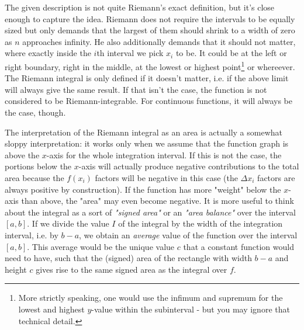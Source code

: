 \medskip
The given description is not quite Riemann's exact definition, but it's close enough to capture the idea. Riemann does not require the intervals to be equally sized but only demands that the largest of them should shrink to a width of zero as $n$ approaches infinity. He also additionally demands that it should not matter, where exactly inside the $i$th interval we pick $x_i$ to be. It could be at the left or right boundary, right in the middle, at the lowest or highest point\footnote{More strictly speaking, one would use the infimum and supremum for the lowest and highest $y$-value within the subinterval - but you may ignore that technical detail.} or whereever. The Riemann integral is only defined if it doesn't matter, i.e. if the above limit will always give the same result. If that isn't the case, the function is not considered to be Riemann-integrable. For continuous functions, it will always be the case, though.




\medskip
The interpretation of the Riemann integral as an area is actually a somewhat sloppy interpretation: it works only when we assume that the function graph is above the $x$-axis for the whole integration interval. If this is not the case, the portions below the $x$-axis will actually produce negative contributions to the total area because the $f(x_i)$ factors will be negative in this case (the $\Delta x_i$ factors are always positive by construction). If the function has more "weight" below the $x$-axis than above, the "area" may even become negative. It is more useful to think about the integral as a sort of \emph{"signed area"} or an \emph{"area balance"} over the interval $[a,b]$. If we divide the value $I$ of the integral by the width of the integration interval, i.e. by $b-a$, we obtain an \emph{average} value of the function over the interval $[a,b]$. This average would be the unique value $c$ that a constant function would need to have, such that the (signed) area of the rectangle with width $b-a$ and height $c$ gives rise to the same signed area as the integral over $f$.

